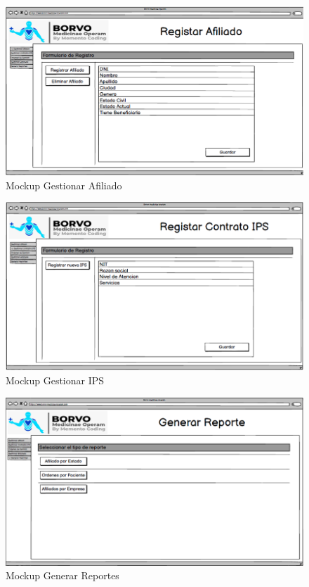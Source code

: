 \documentclass[12pt,a4paper]{article}
\begin{document}
\begin{figure}[H]
\centering
{\includegraphics[width=1\textwidth]{Mockup_4.png}\par}
\caption{Mockup Gestionar Afiliado}
\end{figure}
\begin{figure}[H]
\centering
{\includegraphics[width=1\textwidth]{Mockup_5.png}\par}
\caption{Mockup Gestionar IPS}
\end{figure}
\begin{figure}[H]
\centering
{\includegraphics[width=1\textwidth]{Mockup_6.png}\par}
\caption{Mockup Generar Reportes}
\end{figure}
\end{document}
